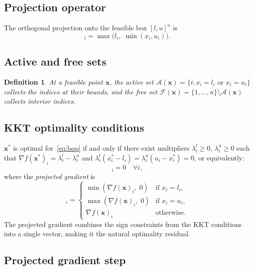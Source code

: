 \documentclass[11pt,a4paper]{article}
\newtheorem{definition}[theorem]{Definition}
\newcommand{\bx}{\mathbf{x}}
\newcommand{\Proj}{\mathcal{P}}
\newcommand{\calF}{\mathcal{F}}
\newcommand{\calA}{\mathcal{A}}
\begin{document}
\subsection{Projection operator}

The orthogonal projection onto the feasible box $[l,u]^n$ is
\begin{equation}
  [\Proj(\bx)]_i = \max\!\bigl(l_i,\;\min(x_i, u_i)\bigr).
  \label{eq:projection}
\end{equation}

\subsection{Active and free sets}

\begin{definition}
  At a feasible point $\bx$, the \emph{active set}
  $\calA(\bx) = \{i : x_i = l_i \text{ or } x_i = u_i\}$ collects
  the indices at their bounds, and the \emph{free set}
  $\calF(\bx) = \{1,\ldots,n\} \setminus \calA(\bx)$ collects interior indices.
\end{definition}

\subsection{KKT optimality conditions}

$\bx^*$ is optimal for~\eqref{eq:bqp} if and only if there exist
multipliers $\lambda_i^l \geq 0$, $\lambda_i^u \geq 0$ such that
$\nabla f(\bx^*)_i = \lambda_i^l - \lambda_i^u$ and
$\lambda_i^l(x_i^* - l_i) = \lambda_i^u(u_i - x_i^*) = 0$,
or equivalently:
\begin{equation}
  [\nabla_P f(\bx^*)]_i = 0 \quad \forall i,
  \label{eq:kkt}
\end{equation}
where the \emph{projected gradient} is
\begin{equation}
  [\nabla_P f(\bx)]_i =
  \begin{cases}
    \min(\nabla f(\bx)_i,\; 0) & \text{if } x_i = l_i, \\
    \max(\nabla f(\bx)_i,\; 0) & \text{if } x_i = u_i, \\
    \nabla f(\bx)_i             & \text{otherwise.}
  \end{cases}
  \label{eq:proj-grad}
\end{equation}
The projected gradient combines the sign constraints from the KKT conditions
into a single vector, making it the natural optimality residual.

\subsection{Projected gradient step}
\end{document}
